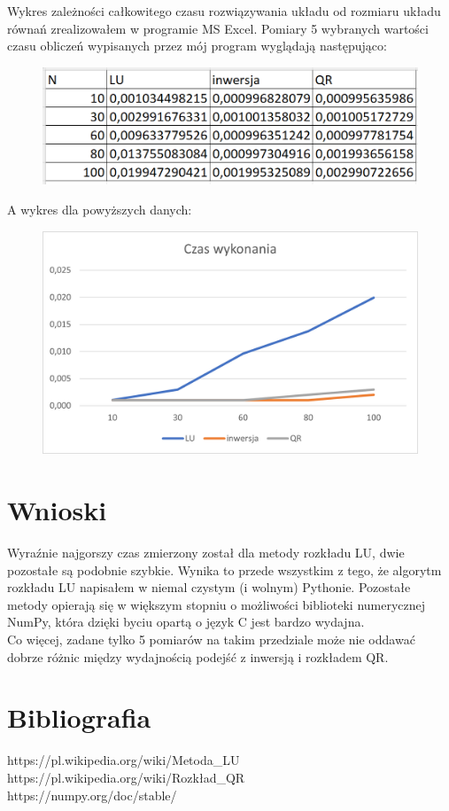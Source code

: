 \documentclass{article}
\begin{document}
\vspace{5mm}
\noindent
Wykres zależności całkowitego czasu rozwiązywania układu od rozmiaru układu równań zrealizowałem w programie MS Excel. Pomiary 5 wybranych wartości czasu obliczeń wypisanych przez mój program wyglądają następująco:
\begin{figure}[h]
    \centering
    \includegraphics[width=\linewidth]{tabela.png}
\end{figure}

\noindent
A wykres dla powyższych danych:
\begin{figure}[h]
    \centering
    \includegraphics[width=\linewidth]{wykres.png}
\end{figure}

\newpage

\section{Wnioski}
Wyraźnie najgorszy czas zmierzony został dla metody rozkładu LU, dwie pozostałe są podobnie szybkie. Wynika to przede wszystkim z tego, że algorytm rozkładu LU napisałem w niemal czystym (i wolnym) Pythonie. Pozostałe metody opierają się w większym stopniu o możliwości biblioteki numerycznej NumPy, która dzięki byciu opartą o język C jest bardzo wydajna.\\
Co więcej, zadane tylko 5 pomiarów na takim przedziale może nie oddawać dobrze różnic między wydajnością podejść z inwersją i rozkładem QR.

\section{Bibliografia}
https://pl.wikipedia.org/wiki/Metoda\_LU\\
https://pl.wikipedia.org/wiki/Rozkład\_QR\\
https://numpy.org/doc/stable/
\end{document}

